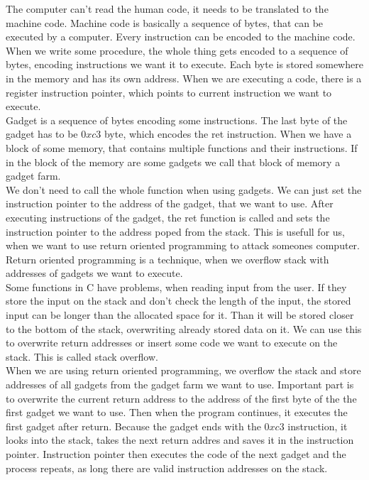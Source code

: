 \documentclass[a4paper]{article}
\begin{document}
The computer can't read the human code, it needs to be translated to the machine code. Machine
code is basically a sequence of bytes, that can be executed by a computer. Every instruction
can be encoded to the machine code. When we write some procedure, the whole thing gets encoded
to a sequence of bytes, encoding instructions we want it to execute. 
Each byte is stored somewhere in the memory and has its own address. When we are executing a code,
there is a register instruction pointer, which points to current instruction
we want to execute. \\
Gadget is a sequence of bytes encoding some instructions. The last byte of the gadget
has to be $0xc3$ byte, which encodes the ret
instruction. When we have a block of some memory, that contains multiple functions and their  
instructions. If in the block of the memory are some gadgets we call that block of memory a 
gadget farm.
\\
We don't need to call the whole function when using gadgets. We can just set the instruction
pointer to the address of the gadget, that we want to use. After executing instructions 
of the gadget, the ret function is called and sets the instruction pointer
to the address poped from the stack. This is usefull for us, when we want to use return oriented
programming to attack someones computer.  \\
Return oriented programming is a technique, when we overflow stack with addresses of gadgets 
we want to execute. \\
Some functions in C have problems, when reading input from the user.
If they store the input on the stack and don't check the length of the input, the stored input can 
be longer
than the allocated space for it. Than it will be stored closer to the bottom of the stack, overwriting
already stored data on it. We can use this to overwrite return addresses or insert some code 
we want to execute on the stack. This is called stack overflow.
\\
When we are using return oriented programming, we overflow the stack and store addresses 
of all gadgets
from the gadget farm we want to use. Important part is to overwrite the current return address to 
the address of the first byte of the the first gadget we want to use. 
Then when the program continues, it 
executes the first gadget after return. Because the gadget ends with the $0xc3$ instruction, it looks
into the stack, takes the next return addres and saves it in the instruction pointer. 
Instruction pointer then executes the code of the next gadget and the process repeats, as long
there are valid instruction addresses on the stack.
\end{document}
